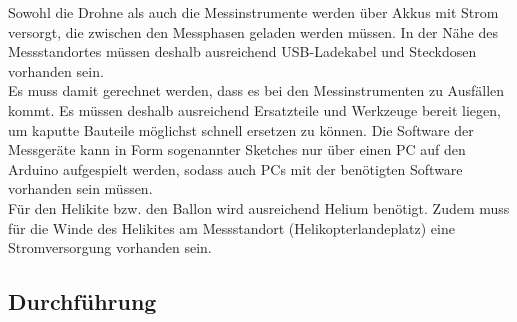 \documentclass[a4paper,11pt,DIV=calc,tablecaptionabove,headinclude,twoside]{article}
\begin{document}
Sowohl die Drohne als auch die Messinstrumente werden über Akkus mit Strom versorgt, die zwischen den Messphasen geladen werden müssen. In der Nähe des Messstandortes müssen deshalb ausreichend USB-Ladekabel und Steckdosen vorhanden sein.\\

Es muss damit gerechnet werden, dass es bei den Messinstrumenten zu Ausfällen kommt. Es müssen deshalb ausreichend Ersatzteile und Werkzeuge bereit liegen, um kaputte Bauteile möglichst schnell ersetzen zu können. Die Software der Messgeräte kann in Form sogenannter Sketches nur über einen PC auf den Arduino aufgespielt werden, sodass auch PCs mit der benötigten Software vorhanden sein müssen.\\

Für den Helikite bzw. den Ballon wird ausreichend Helium benötigt. Zudem muss für die Winde des Helikites am Messstandort (Helikopterlandeplatz) eine Stromversorgung vorhanden sein. \\
 

%	

\subsection{Durchführung}
\end{document}
